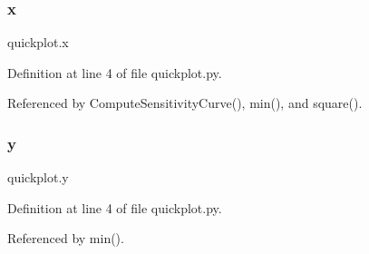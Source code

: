 \mbox{\label{namespacequickplot_a81eab613e6132e2f34362e0d796374b6}} 
\subsubsection{\texorpdfstring{x}{x}}
{\footnotesize\ttfamily quickplot.\+x}



Definition at line 4 of file quickplot.\+py.



Referenced by Compute\+Sensitivity\+Curve(), min(), and square().

\mbox{\label{namespacequickplot_a010fcab3235443a7866d032bea36b2e8}} 
\subsubsection{\texorpdfstring{y}{y}}
{\footnotesize\ttfamily quickplot.\+y}



Definition at line 4 of file quickplot.\+py.



Referenced by min().

